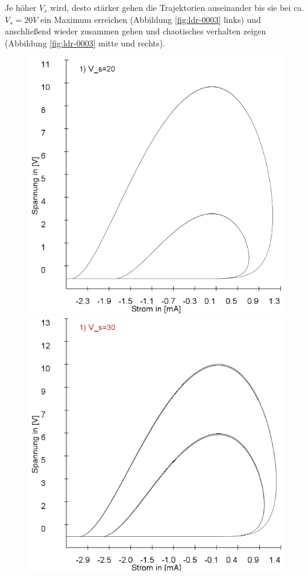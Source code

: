 \documentclass{scrartcl}
\begin{document}
Je höher $V_s$ wird, desto stärker gehen die Trajektorien auseinander bis sie bei ca. $V_s=20V$ ein Maximum erreichen (Abbildung \ref{fig:ldr-0003} links) und anschließend wieder zusammen gehen und chaotisches verhalten zeigen (Abbildung \ref{fig:ldr-0003} mitte und rechts).
\begin{figure}[!htbp]
\includegraphics[scale=0.28]{schwing-runge-nach300k-weitere20k-10-9-20V}
\includegraphics[scale=0.28]{schwing-runge-nach300k-weitere20k-10-9-30V}

\end{figure}
\end{document}
